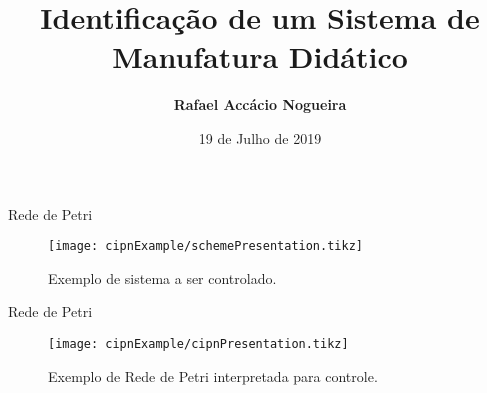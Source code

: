\documentclass[aspectratio=169,14pt]{beamer} %
\author{\small \textbf{Rafael Accácio Nogueira}}
\title{\setlength\lineskip{10pt} \Large \textbf{Identificação de um Sistema de Manufatura Didático}}
\institute{}
\date{19 de Julho de 2019}
\begin{document}
 

\newcommand{\bulletpoint}[1]{\begin{itemize}
		\item #1
\end{itemize}}



\begin{frame}{Rede de Petri}
\begin{figure}[H]
  \centering \texttt{[image: cipnExample/schemePresentation.tikz]}
  \caption{Exemplo de sistema a ser controlado.}
  \label{fig:cipnexamplescheme}
\end{figure}
\end{frame}
 
\begin{frame}{Rede de Petri}
\begin{figure}[H]
  \centering \texttt{[image: cipnExample/cipnPresentation.tikz]}
  \caption{Exemplo de Rede de Petri interpretada para controle.}
  \label{fig:cipnexample}
\end{figure}
\end{frame}
\end{document}
